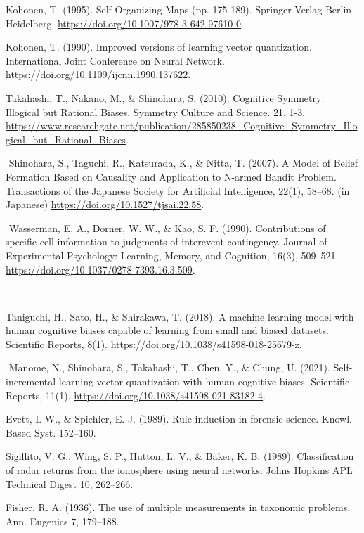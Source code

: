 \documentclass[12pt,twoside]{report}
\begin{document}
\begin{thebibliography}{26}

Kohonen, T. (1995). Self-Organizing Maps (pp. 175-189). Springer-Verlag Berlin Heidelberg. \url{https://doi.org/10.1007/978-3-642-97610-0}.

Kohonen, T. (1990). Improved versions of learning vector quantization. International Joint Conference on Neural Network. \url{https://doi.org/10.1109/ijcnn.1990.137622}.

Takahashi, T., Nakano, M., \& Shinohara, S. (2010). Cognitive Symmetry: Illogical but Rational Biases. Symmetry Culture and Science. 21. 1-3. \url{https://www.researchgate.net/publication/285850238_Cognitive_Symmetry_Illogical_but_Rational_Biases}.

‌
Shinohara, S., Taguchi, R., Katsurada, K., \& Nitta, T. (2007). A Model of Belief Formation Based on Causality and Application to N-armed Bandit Problem. Transactions of the Japanese Society for Artificial Intelligence, 22(1), 58–68. (in Japanese) \url{https://doi.org/10.1527/tjsai.22.58}.

‌
Wasserman, E. A., Dorner, W. W., \& Kao, S. F. (1990). Contributions of specific cell information to judgments of interevent contingency. Journal of Experimental Psychology: Learning, Memory, and Cognition, 16(3), 509–521. \url{https://doi.org/10.1037/0278-7393.16.3.509}.

‌

Taniguchi, H., Sato, H., \& Shirakawa, T. (2018). A machine learning model with human cognitive biases capable of learning from small and biased datasets. Scientific Reports, 8(1). \url{https://doi.org/10.1038/s41598-018-25679-z}.

‌
Manome, N., Shinohara, S., Takahashi, T., Chen, Y., \& Chung, U. (2021). Self-incremental learning vector quantization with human cognitive biases. Scientific Reports, 11(1). \url{https://doi.org/10.1038/s41598-021-83182-4}.


Evett, I. W., \& Spiehler, E. J. (1989). Rule induction in forensic science. Knowl. Based Syst. 152–160.

Sigillito, V. G., Wing, S. P., Hutton, L. V., \& Baker, K. B. (1989). Classification of radar returns from the ionosphere using neural networks.
Johns Hopkins APL Technical Digest 10, 262–266.

Fisher, R. A. (1936). The use of multiple measurements in taxonomic problems. Ann. Eugenics 7, 179–188.


\end{thebibliography}
\end{document}
